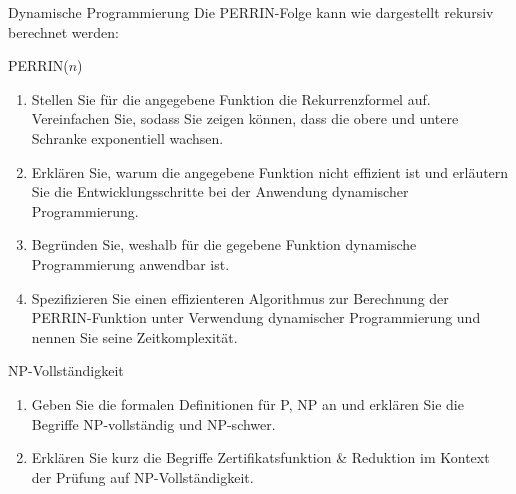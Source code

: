\documentclass{article}
\begin{document}
\begin{exercise}{Dynamische Programmierung}
  Die PERRIN-Folge kann wie dargestellt rekursiv berechnet werden:
  \begin{algorithm}[ht]
    \caption{PERRIN($n$)}
  \end{algorithm}
  \begin{enumerate}
    \item Stellen Sie für die angegebene Funktion die Rekurrenzformel auf. Vereinfachen Sie, sodass Sie zeigen können, dass die obere und untere Schranke exponentiell wachsen.
    \item Erklären Sie, warum die angegebene Funktion nicht effizient ist und erläutern Sie die Entwicklungsschritte bei der Anwendung dynamischer Programmierung.
    \item Begründen Sie, weshalb für die gegebene Funktion dynamische Programmierung anwendbar ist.
    \item Spezifizieren Sie einen effizienteren Algorithmus zur Berechnung der PERRIN-Funktion unter Verwendung dynamischer Programmierung und nennen Sie seine Zeitkomplexität.
  \end{enumerate}
\end{exercise}

\begin{exercise}{NP-Vollständigkeit}
  \begin{enumerate}
    \item Geben Sie die formalen Definitionen für P, NP an und erklären Sie die Begriffe NP-vollständig und NP-schwer.
    \item Erklären Sie kurz die Begriffe Zertifikatsfunktion \& Reduktion im Kontext der Prüfung auf NP-Vollständigkeit.
  \end{enumerate}
\end{exercise}
\end{document}
